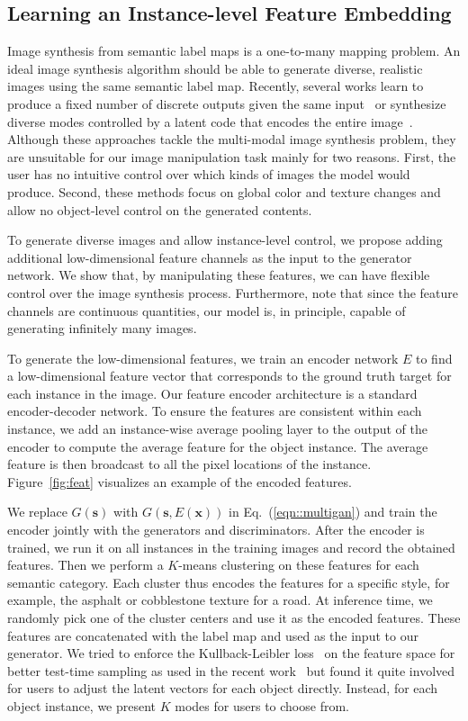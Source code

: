\subsection{Learning an Instance-level Feature Embedding}
\label{sec:alg:feat}

Image synthesis from semantic label maps is a one-to-many mapping problem. An ideal image synthesis algorithm should be able to generate diverse, realistic images using the same semantic label map. Recently, several works learn to produce a fixed number of discrete outputs given the same input~\cite{ghosh2017multi,chen2017photographic} or synthesize diverse modes controlled by a latent code that encodes the entire image~\cite{zhu2017toward}. Although these approaches tackle the multi-modal image synthesis problem, they are unsuitable for our image manipulation task mainly for two reasons. First, the user has no intuitive control over which kinds of images the model would produce\cite{ghosh2017multi,chen2017photographic}. Second, these methods focus on global color and texture changes and allow no object-level control on the generated contents. 

To generate diverse images and allow instance-level control, we propose adding additional low-dimensional feature channels as the input to the generator network. We show that, by manipulating these features, we can have flexible control over the image synthesis process. Furthermore, note that since the feature channels are continuous quantities, our model is, in principle, capable of generating infinitely many images.

To generate the low-dimensional features, we train an encoder network $E$ to find a low-dimensional feature vector that corresponds to the ground truth target for each instance in the image. Our feature encoder architecture is a standard encoder-decoder network. To ensure the features are consistent within each instance, we add an instance-wise average pooling layer to the output of the encoder to compute the average feature for the object instance. The average feature is then broadcast to all the pixel locations of the instance. Figure~\ref{fig:feat} visualizes an example of the encoded features.

We replace $G(\mathbf{s})$ with $G(\mathbf{s}, E(\mathbf{x}))$ in Eq.~(\ref{eqn::multigan}) and train the encoder jointly with the generators and discriminators. After the encoder is trained, we run it on all instances in the training images and record the obtained features. Then we perform a $K$-means clustering on these features for each semantic category. Each cluster thus encodes the features for a specific style, for example, the asphalt or cobblestone texture for a road. At inference time, we randomly pick one of the cluster centers and use it as the encoded features. These features are concatenated with the label map and used as the input to our generator. We tried to enforce the Kullback-Leibler loss~\cite{kingma2013auto} on the feature space for better test-time sampling as used in the recent work~\cite{zhu2017toward} but found it quite involved for users to adjust the latent vectors for each object directly. Instead, for each object instance, we  present $K$ modes for users to choose from.

